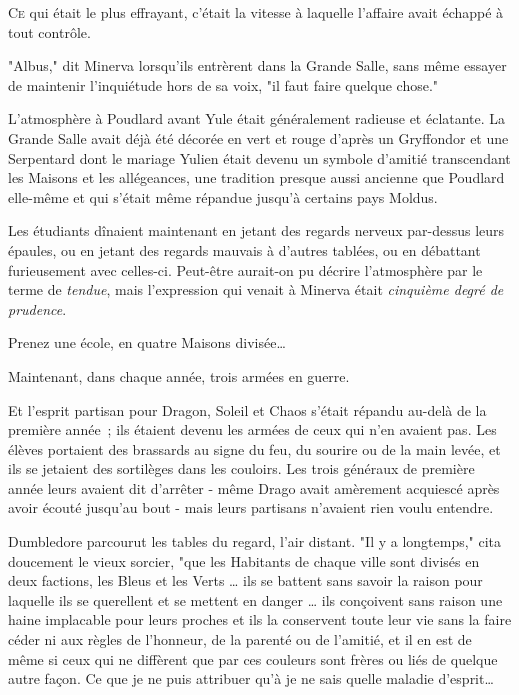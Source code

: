 

\lettrine{C}{e} qui était le plus effrayant, c'était la vitesse à laquelle l'affaire avait échappé à tout contrôle.

"Albus," dit Minerva lorsqu'ils entrèrent dans la Grande Salle, sans même essayer de maintenir l'inquiétude hors de sa voix, "il faut faire quelque chose."

L'atmosphère à Poudlard avant Yule était généralement radieuse et éclatante. La Grande Salle avait déjà été décorée en vert et rouge d'après un Gryffondor et une Serpentard dont le mariage Yulien était devenu un symbole d'amitié transcendant les Maisons et les allégeances, une tradition presque aussi ancienne que Poudlard elle-même et qui s'était même répandue jusqu'à certains pays Moldus.

Les étudiants dînaient maintenant en jetant des regards nerveux par-dessus leurs épaules, ou en jetant des regards mauvais à d'autres tablées, ou en débattant furieusement avec celles-ci. Peut-être aurait-on pu décrire l'atmosphère par le terme de \emph{tendue}, mais l'expression qui venait à Minerva était \emph{cinquième degré de prudence}.

Prenez une école, en quatre Maisons divisée…

Maintenant, dans chaque année, trois armées en guerre.

Et l'esprit partisan pour Dragon, Soleil et Chaos s'était répandu au-delà de la première année~; ils étaient devenu les armées de ceux qui n'en avaient pas. Les élèves portaient des brassards au signe du feu, du sourire ou de la main levée, et ils se jetaient des sortilèges dans les couloirs. Les trois généraux de première année leurs avaient dit d'arrêter - même Drago avait amèrement acquiescé après avoir écouté jusqu'au bout - mais leurs partisans n'avaient rien voulu entendre.

Dumbledore parcourut les tables du regard, l'air distant. "Il y a longtemps," cita doucement le vieux sorcier, "que les Habitants de chaque ville sont divisés en deux factions, les Bleus et les Verts … ils se battent sans savoir la raison pour laquelle ils se querellent et se mettent en danger … ils conçoivent sans raison une haine implacable pour leurs proches et ils la conservent toute leur vie sans la faire céder ni aux règles de l'honneur, de la parenté ou de l'amitié, et il en est de même si ceux qui ne diffèrent que par ces couleurs sont frères ou liés de quelque autre façon. Ce que je ne puis attribuer qu'à je ne sais quelle maladie d'esprit…

